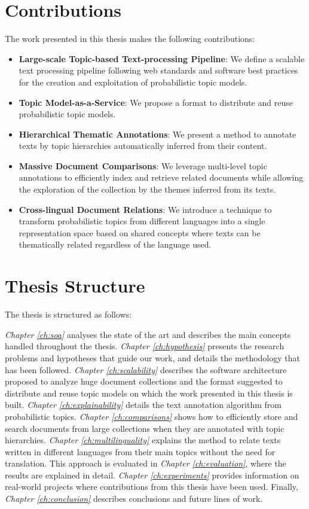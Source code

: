 \section{Contributions}

The work presented in this thesis makes the following contributions:

\begin{itemize}
\item \textbf{Large-scale Topic-based Text-processing Pipeline}: We define a scalable text processing pipeline following web standards and software best practices for the creation and exploitation of probabilistic topic models.
\item \textbf{Topic Model-as-a-Service}: We propose a format to distribute and reuse probabilistic topic models.
\item \textbf{Hierarchical Thematic Annotations}: We present a method to annotate texts by topic hierarchies automatically inferred from their content.
\item \textbf{Massive Document Comparisons}: We leverage multi-level topic annotations to efficiently index and retrieve related documents while allowing the exploration of the collection by the themes inferred from its texts.
\item \textbf{Cross-lingual Document Relations}: We introduce a technique to transform probabilistic topics from different languages into a single representation space based on shared concepts where texts can be thematically related regardless of the language used.
\end{itemize}

\section{Thesis Structure}

The thesis is structured as follows:

\textit{Chapter \ref{ch:soa}} analyses the state of the art and describes the main concepts handled throughout the thesis. \textit{Chapter \ref{ch:hypothesis}} presents the research problems and hypotheses that guide our work, and details the methodology that has been followed. \textit{Chapter \ref{ch:scalability}} describes the software architecture proposed to analyze huge document collections and the format suggested to distribute and reuse topic models on which the work presented in this thesis is built. \textit{Chapter \ref{ch:explainability}} details the text annotation algorithm from probabilistic topics. \textit{Chapter \ref{ch:comparisons}} shows how to efficiently store and search documents from large collections when they are annotated with topic hierarchies.  \textit{Chapter \ref{ch:multilinguality}} explains the method to relate texts written in different languages from their main topics without the need for translation. This approach is evaluated in \textit{Chapter \ref{ch:evaluation}}, where the results are explained in detail. \textit{Chapter \ref{ch:experiments}} provides information on real-world projects where contributions from this thesis have been used. Finally, \textit{Chapter \ref{ch:conclusion}} describes conclusions and future lines of work.


